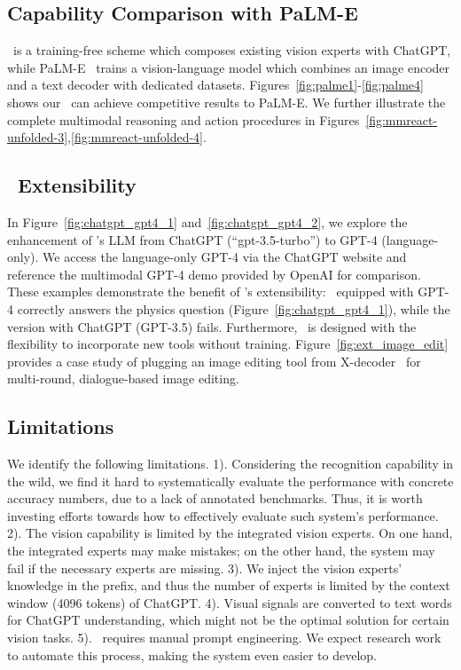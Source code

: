 \subsection{Capability Comparison with PaLM-E}
\modelname~is a training-free scheme which composes existing vision experts with ChatGPT,
while PaLM-E~\cite{driess2023palme} trains a vision-language model which combines an image encoder and a text decoder with dedicated datasets.
Figures~\ref{fig:palme1}-\ref{fig:palme4} shows our \modelname~can achieve
competitive results to PaLM-E.
We further illustrate the complete multimodal reasoning and action procedures in Figures~\ref{fig:mmreact-unfolded-3},\ref{fig:mmreact-unfolded-4}.



\subsection{\textbf{\modelname}~Extensibility}
\label{sec:4.5}
In Figure~\ref{fig:chatgpt_gpt4_1} and~\ref{fig:chatgpt_gpt4_2}, we explore the enhancement of \modelname's LLM from ChatGPT (``gpt-3.5-turbo'') to GPT-4 (language-only). We access the language-only GPT-4 via the ChatGPT website and reference the multimodal GPT-4 demo provided by OpenAI for comparison. These examples demonstrate the benefit of \modelname's extensibility: \modelname~equipped with GPT-4 correctly answers the physics question (Figure~\ref{fig:chatgpt_gpt4_1}), while the version with ChatGPT (GPT-3.5) fails. Furthermore, \modelname~is designed with the flexibility to incorporate new tools without training. Figure~\ref{fig:ext_image_edit} provides a case study of plugging an image editing tool from X-decoder~\cite{zou2022xdecoder} for multi-round, dialogue-based image editing.



\subsection{Limitations}
We identify the following limitations. 
1). Considering the recognition capability in the wild, we find it hard to systematically evaluate the performance  with concrete accuracy numbers, due to 
a lack of annotated benchmarks. 
Thus, it is worth investing efforts towards how to effectively evaluate such system's performance.
2). The vision capability is limited by the integrated vision
experts. On one hand, the integrated experts may make mistakes; on the other hand, the system may fail if the necessary experts are missing. 
3). We inject the vision experts' knowledge in the prefix, and thus the number of experts is limited by the context window (4096 tokens) of ChatGPT. 
4). Visual signals are converted to text words
for ChatGPT understanding, which  might not be the optimal solution for certain vision tasks. 
5). \modelname~requires manual prompt engineering. We expect research work to automate this process, making the system even easier to develop.

